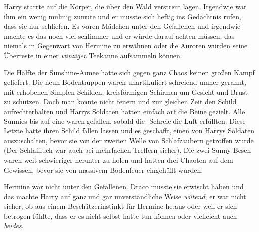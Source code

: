 \later

Harry starrte auf die Körper, die über den Wald verstreut lagen. Irgendwie war ihm ein wenig mulmig zumute und er musste sich heftig ins Gedächtnis rufen, dass sie nur schliefen. Es waren Mädchen unter den Gefallenen und irgendwie machte es das noch viel schlimmer und er würde darauf achten müssen, das niemals in Gegenwart von Hermine zu erwähnen oder die Auroren würden seine Überreste in einer \emph{winzigen} Teekanne aufsammeln können.

Die Hälfte der Sunshine-Armee hatte sich gegen ganz Chaos keinen großen Kampf geliefert. Die neun Bodentruppen waren unartikuliert schreiend umher gerannt, mit erhobenen Simplen Schilden, kreisförmigen Schirmen um Gesicht und Brust zu schützen. Doch man konnte nicht feuern und zur gleichen Zeit den Schild aufrechterhalten und Harrys Soldaten hatten einfach auf die Beine gezielt. Alle Sunnies bis auf eine waren gefallen, sobald die -Schreie die Luft erfüllten. Diese Letzte hatte ihren Schild fallen lassen und es geschafft, einen von Harrys Soldaten auszuschalten, bevor sie von der zweiten Welle von Schlafzaubern getroffen wurde (Der Schlaffluch war auch bei mehrfachen Treffern sicher). Die zwei Sunny-Besen waren weit schwieriger herunter zu holen und hatten drei Chaoten auf dem Gewissen, bevor sie von massivem Bodenfeuer eingehüllt wurden.

Hermine war nicht unter den Gefallenen. Draco musste sie erwischt haben und das machte Harry auf ganz und gar unverständliche Weise \emph{wütend}; er war nicht sicher, ob aus einem Beschützerinstinkt für Hermine heraus oder weil er sich betrogen fühlte, dass er es nicht selbst hatte tun können oder vielleicht auch \emph{beides}.

